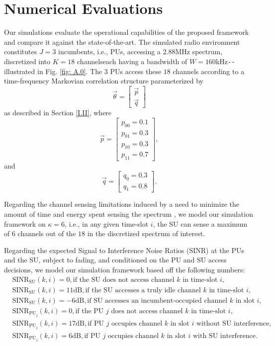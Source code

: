 \documentclass[12pt, draftcls, onecolumn]{IEEEtran}
\begin{document}
\section{Numerical Evaluations}\label{III}
Our simulations evaluate the operational capabilities of the proposed framework and compare it against the state-of-the-art. The simulated radio environment constitutes $J{=}3$ incumbents, i.e., PUs, accessing a $2.88$MHz spectrum, discretized into $K{=}18$ channels\text{-}each having a bandwidth of $W{=}160$kHz\texttt{-{}-}illustrated in Fig. \ref{fig: A.0}. The $3$ PUs access these $18$ channels according to a time-frequency Markovian correlation structure parameterized by
\[\vec{\theta}=\begin{bmatrix}
                    \vec{p}\\
                    \vec{q}
               \end{bmatrix}\]
as described in Section \ref{I.II}, where 
\[\vec{p}=\begin{bmatrix}
            p_{00}=0.1\\
            p_{01}=0.3\\
            p_{10}=0.3\\
            p_{11}=0.7
          \end{bmatrix},\]
and
\[\vec{q}=\begin{bmatrix}
            q_{0}=0.3\\
            q_{1}=0.8
          \end{bmatrix}.\]

Regarding the channel sensing limitations induced by a need to minimize the amount of time and energy spent sensing the spectrum \cite{WCL:3}, we model our simulation framework on $\kappa{=}6$, i.e., in any given time-slot $i$, the SU can sense a maximum of $6$ channels out of the $18$ in the discretized spectrum of interest.

Regarding the expected Signal to Interference Noise Ratios (SINR) at the PUs and the SU, subject to fading, and conditioned on the PU and SU access decisions, we model our simulation framework based off the following numbers:
\begin{align*}
    &\text{SINR}_{\text{SU}}(k,i){=}0,\text{if the SU does not access channel $k$ in time-slot $i$,}\\
    &\text{SINR}_{\text{SU}}(k,i){=}11\text{dB},\text{if the SU accesses a truly idle channel $k$ in time-slot $i$,}\\
    &\text{SINR}_{\text{SU}}(k,i){=}-6\text{dB},\text{if SU accesses an incumbent-occupied channel $k$ in slot $i$,}\\
    &\text{SINR}_{\text{PU}_{j}}(k,i){=}0,\text{if the PU $j$ does not access channel $k$ in time-slot $i$,}\\
    &\text{SINR}_{\text{PU}_{j}}(k,i){=}17\text{dB},\text{if PU $j$ occupies channel $k$ in slot $i$ without SU interference,}\\
    &\text{SINR}_{\text{PU}_{j}}(k,i){=}6\text{dB},\text{if PU $j$ occupies channel $k$ in slot $i$ with SU interference.}
\end{align*}
\end{document}
